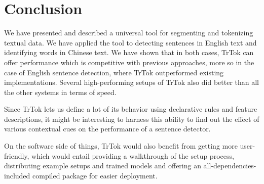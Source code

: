 \section{Conclusion}
\label{sec:outro}

We have presented and described a universal tool for segmenting and
tokenizing textual data. We have applied the tool to detecting
sentences in English text and identifying words in Chinese text. We
have shown that in both cases, TrTok can offer performance which is
competitive with previous approaches, more so in the case of English
sentence detection, where TrTok outperformed existing implementations.
Several high-performing setups of TrTok also did better than all the
other systems in terms of speed.

Since TrTok lets us define a lot of its behavior using declarative
rules and feature descriptions, it might be interesting to harness
this ability to find out the effect of various contextual cues on the
performance of a sentence detector.

On the software side of things, TrTok would also benefit from getting
more user-friendly, which would entail providing a walkthrough of the
setup process, distributing example setups and trained models and
offering an all-dependencies-included compiled package for easier
deployment.
